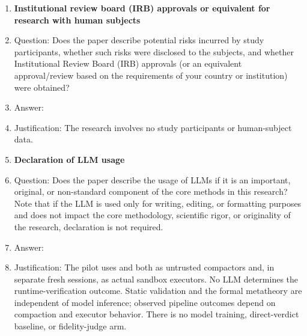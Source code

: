 \begin{enumerate}
\item {\bf Institutional review board (IRB) approvals or equivalent for research with human subjects}
    \item[] Question: Does the paper describe potential risks incurred by study participants, whether such risks were disclosed to the subjects, and whether Institutional Review Board (IRB) approvals (or an equivalent approval/review based on the requirements of your country or institution) were obtained?
    \item[] Answer: \answerNA{}
    \item[] Justification: The research involves no study participants or human-subject data.

\item {\bf Declaration of LLM usage}
    \item[] Question: Does the paper describe the usage of LLMs if it is an important, original, or non-standard component of the core methods in this research? Note that if the LLM is used only for writing, editing, or formatting purposes and does not impact the core methodology, scientific rigor, or originality of the research, declaration is not required.
    \item[] Answer: \new{\answerYes{}}
    \item[] Justification: The pilot uses  and  both as untrusted compactors and, in separate fresh sessions, as actual sandbox executors. No LLM determines the runtime-verification outcome. Static validation and the formal metatheory are independent of model inference; observed pipeline outcomes depend on compaction and executor behavior. There is no model training, direct-verdict baseline, or fidelity-judge arm.

\end{enumerate}
